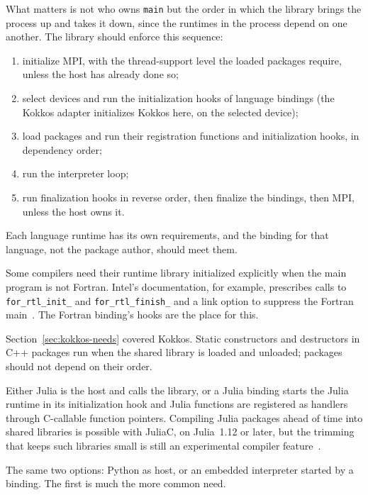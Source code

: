 \documentclass[11pt,a4paper]{article}
\newcommand{\code}[1]{\texttt{#1}}
\begin{document}
What matters is not who owns \code{main} but the order in which the library
brings the process up and takes it down, since the runtimes in the process
depend on one another.  The library should enforce this sequence:

\begin{enumerate}
  \item initialize MPI, with the thread-support level the loaded packages
        require, unless the host has already done so;
  \item select devices and run the initialization hooks of language bindings
        (the Kokkos adapter initializes Kokkos here, on the selected device);
  \item load packages and run their registration functions and
        initialization hooks, in dependency order;
  \item run the interpreter loop;
  \item run finalization hooks in reverse order, then finalize the bindings,
        then MPI, unless the host owns it.
\end{enumerate}

Each language runtime has its own requirements, and the binding for that
language, not the package author, should meet them.

\begin{description}[style=nextline,leftmargin=2em]
  \item[Fortran.]
        Some compilers need their runtime library initialized explicitly when
        the main program is not Fortran.  Intel's documentation, for example,
        prescribes calls to \code{for\_rtl\_init\_} and
        \code{for\_rtl\_finish\_} and a link option to suppress the Fortran
        main~\cite{intelmixed}.  The Fortran binding's hooks are the place for
        this.
  \item[C++ and Kokkos.]
        Section~\ref{sec:kokkos-needs} covered Kokkos.  Static constructors
        and destructors in C++ packages run when the shared library is loaded
        and unloaded; packages should not depend on their order.
  \item[Julia.]
        Either Julia is the host and calls the library, or a Julia binding
        starts the Julia runtime in its initialization hook and Julia
        functions are registered as handlers through C-callable function
        pointers.  Compiling Julia packages ahead of time into shared
        libraries is possible with JuliaC, on Julia~1.12 or later, but the
        trimming that keeps such libraries small is still an experimental
        compiler feature~\cite{juliac}.
  \item[Python.]
        The same two options: Python as host, or an embedded interpreter
        started by a binding.  The first is much the more common need.
\end{description}
\end{document}
